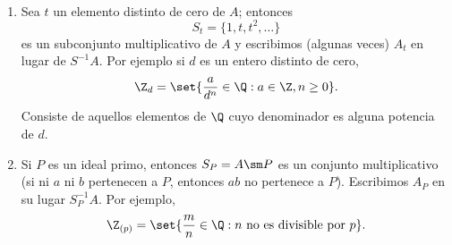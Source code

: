 \begin{example}~
\begin{enumerate}
  \item Sea $t$ un elemento distinto de cero de $A$; entonces
    \[
      S_t = \{1,t,t^2,\ldots\}
    \]
  es un subconjunto multiplicativo de $A$ y escribimos (algunas veces) $A_t$ en lugar de $S^{-1}A$. Por ejemplo si $d$ es un entero distinto de cero,
  \[
    \Z_d = \set{ \frac{a}{d^{n}} \in \Q : a \in \Z,  n \geq 0 }.
  \]
  Consiste de aquellos elementos de $\Q$ cuyo denominador es alguna potencia de $d$.

  \item Si $P$ es un ideal primo, entonces $S_P = A \sm P$ es un conjunto multiplicativo (si ni $a$ ni $b$ pertenecen a $P$, entonces $ab$ no pertenece  a $P$). Escribimos $A_P$ en su lugar $S^{-1}_P A.$ Por ejemplo,
  \[
    \Z_{(p)} = \set{\frac{m}{n} \in \Q : n \ \text{no es divisible por}\ p}.
  \]
\end{enumerate}
\end{example}

